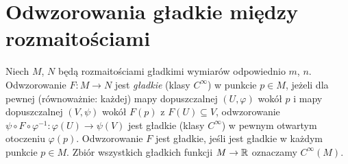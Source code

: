 \section{Odwzorowania gładkie między rozmaitościami}

\begin{definicja}
Niech $M$, $N$ będą rozmaitościami gładkimi wymiarów odpowiednio $m$, $n$. Odwzorowanie
$F\colon M\to N$ jest \emph{gładkie} (klasy $C^\infty$) w punkcie $p\in M$, jeżeli dla
pewnej (równoważnie: każdej) mapy dopuszczalnej $(U,\varphi)$ wokół $p$ i mapy
dopuszczalnej $(V,\psi)$ wokół $F(p)$ z $F(U)\subseteq V$, odwzorowanie
$\psi\circ F\circ\varphi^{-1}\colon\varphi(U)\to\psi(V)$
jest gładkie (klasy $C^\infty$) w pewnym otwartym otoczeniu
$\varphi(p)$. Odwzorowanie $F$ jest gładkie, jeśli jest gładkie w każdym punkcie $p\in M$.
Zbiór wszystkich gładkich funkcji $M\to\mathbb{R}$ oznaczamy $C^\infty(M)$.
\end{definicja}
